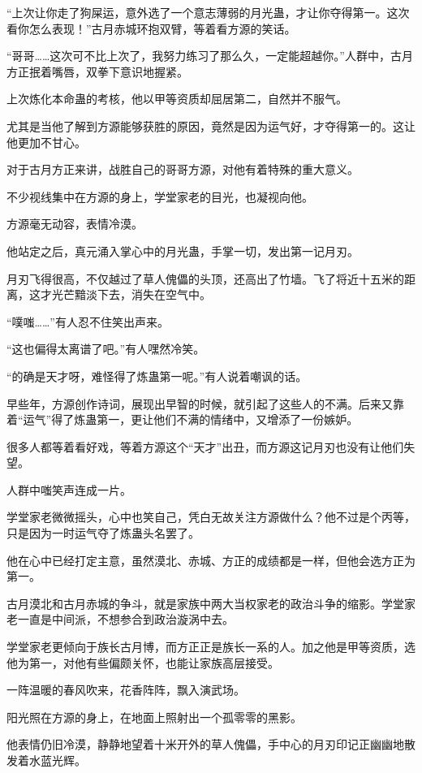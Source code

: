 \begin{this_body}
“上次让你走了狗屎运，意外选了一个意志薄弱的月光蛊，才让你夺得第一。这次看你怎么表现！”古月赤城环抱双臂，等着看方源的笑话。

“哥哥……这次可不比上次了，我努力练习了那么久，一定能超越你。”人群中，古月方正抿着嘴唇，双拳下意识地握紧。

上次炼化本命蛊的考核，他以甲等资质却屈居第二，自然并不服气。

尤其是当他了解到方源能够获胜的原因，竟然是因为运气好，才夺得第一的。这让他更加不甘心。

对于古月方正来讲，战胜自己的哥哥方源，对他有着特殊的重大意义。

不少视线集中在方源的身上，学堂家老的目光，也凝视向他。

方源毫无动容，表情冷漠。

他站定之后，真元涌入掌心中的月光蛊，手掌一切，发出第一记月刃。

月刃飞得很高，不仅越过了草人傀儡的头顶，还高出了竹墙。飞了将近十五米的距离，这才光芒黯淡下去，消失在空气中。

“噗嗤……”有人忍不住笑出声来。

“这也偏得太离谱了吧。”有人嘿然冷笑。

“的确是天才呀，难怪得了炼蛊第一呢。”有人说着嘲讽的话。

早些年，方源创作诗词，展现出早智的时候，就引起了这些人的不满。后来又靠着“运气”得了炼蛊第一，更让他们不满的情绪中，又增添了一份嫉妒。

很多人都等着看好戏，等着方源这个“天才”出丑，而方源这记月刃也没有让他们失望。

人群中嗤笑声连成一片。

学堂家老微微摇头，心中也笑自己，凭白无故关注方源做什么？他不过是个丙等，只是因为一时运气夺了炼蛊头名罢了。

他在心中已经打定主意，虽然漠北、赤城、方正的成绩都是一样，但他会选方正为第一。

古月漠北和古月赤城的争斗，就是家族中两大当权家老的政治斗争的缩影。学堂家老一直是中间派，不想参合到政治漩涡中去。

学堂家老更倾向于族长古月博，而方正正是族长一系的人。加之他是甲等资质，选他为第一，对他有些偏颇关怀，也能让家族高层接受。

一阵温暖的春风吹来，花香阵阵，飘入演武场。

阳光照在方源的身上，在地面上照射出一个孤零零的黑影。

他表情仍旧冷漠，静静地望着十米开外的草人傀儡，手中心的月刃印记正幽幽地散发着水蓝光辉。


\end{this_body}
